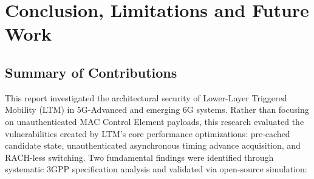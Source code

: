 \chapter{Conclusion, Limitations and Future Work}
\label{ch:conclusion}

\section{Summary of Contributions}

This report investigated the architectural security of Lower-Layer Triggered Mobility (LTM) in
5G-Advanced and emerging 6G systems. Rather than focusing on unauthenticated MAC Control Element payloads,
this research evaluated the vulnerabilities created by LTM's core performance optimizations: pre-cached
candidate state, unauthenticated asynchronous timing advance acquisition, and RACH-less switching. Two
fundamental findings were identified through systematic 3GPP specification analysis and validated via
open-source simulation:

